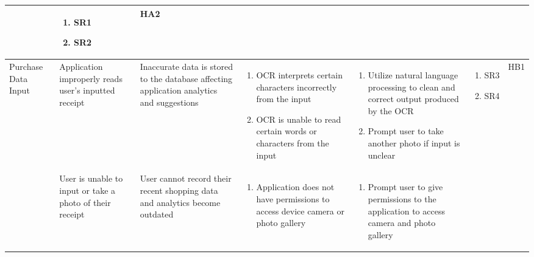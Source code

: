 \documentclass{article}
\begin{document}
\begin{landscape}
\begin{longtable}{|p{}|p{}|p{}|p{}|p{}|p{}|p{}|}
\begin{enumerate}[label=\alph*., leftmargin=*]
        \end{enumerate}
        & \begin{enumerate}[label=\alph*., leftmargin=*]
            \item SR1
            \item SR2
        \end{enumerate}
        & HA2 \\
        \hline
        Purchase Data Input
        & Application improperly reads user's inputted receipt
        & Inaccurate data is stored to the database affecting application analytics and suggestions
        & \begin{enumerate}[label=\alph*., leftmargin=*]
            \item OCR interprets certain characters incorrectly from the input
            \item OCR is unable to read certain words or characters from the input
        \end{enumerate}
        & \begin{enumerate}[label=\alph*., leftmargin=*]
            \item Utilize natural language processing to clean and correct output produced by the OCR
            \item Prompt user to take another photo if input is unclear
        \end{enumerate}
        & \begin{enumerate}[label=\alph*., leftmargin=*]
            \item SR3
            \item SR4
        \end{enumerate}
        & HB1 \\
        \cline{2-7}
        & User is unable to input or take a photo of their receipt
        & User cannot record their recent shopping data and analytics become outdated
        & \begin{enumerate}[label=\alph*., leftmargin=*]
            \item Application does not have permissions to access device camera or photo gallery
        \end{enumerate}
        & \begin{enumerate}[label=\alph*., leftmargin=*]
            \item Prompt user to give permissions to the application to access camera and photo gallery
        \end{enumerate}
        & \begin{enumerate}[label=\alph*., leftmargin=*]

\end{enumerate}
\end{longtable}
\end{landscape}
\end{document}
